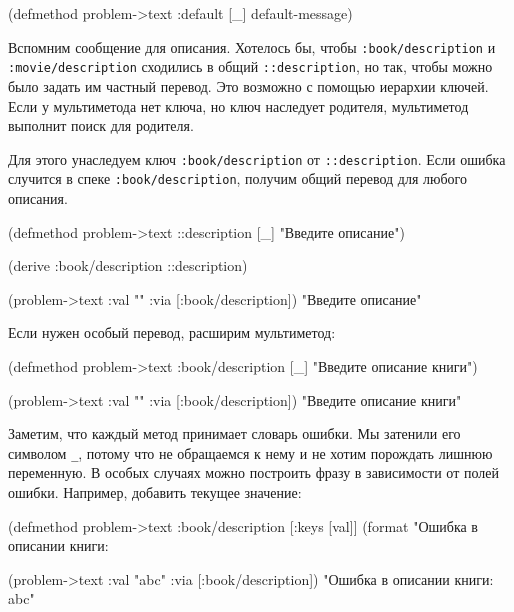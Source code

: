 \begin{english}
  \begin{clojure}
(defmethod problem->text :default [_]
  default-message)
  \end{clojure}
\end{english}


Вспомним сообщение для описания. Хотелось бы, чтобы \verb|:book/description| и
\verb|:movie/description| сходились в общий \verb|::description|, но так,
чтобы можно было задать им частный перевод. Это возможно с помощью иерархии
ключей. Если у мультиметода нет ключа, но ключ наследует родителя, мультиметод
выполнит поиск для родителя.

Для этого унаследуем ключ \verb|:book/description| от
\verb|::description|. Если ошибка случится в спеке \verb|:book/description|,
получим общий перевод для любого описания.


  \begin{clojure}
(defmethod problem->text ::description [_]
  "Введите описание")

(derive :book/description ::description)

(problem->text {:val "" :via [:book/description]})
"Введите описание"
  \end{clojure}

\noindent
Если нужен особый перевод, расширим мультиметод:

  \begin{clojure}
(defmethod problem->text :book/description [_]
  "Введите описание книги")

(problem->text {:val "" :via [:book/description]})
"Введите описание книги"
  \end{clojure}


Заметим, что каждый метод принимает словарь ошибки. Мы затенили его символом
\verb|_|, потому что не обращаемся к нему и не хотим порождать лишнюю
переменную. В особых случаях можно построить фразу в зависимости от полей
ошибки. Например, добавить текущее значение:

  \begin{clojure}
(defmethod problem->text :book/description
  [{:keys [val]}]
  (format "Ошибка в описании книги: %

(problem->text {:val "abc" :via [:book/description]})
"Ошибка в описании книги: abc"
  \end{clojure}

